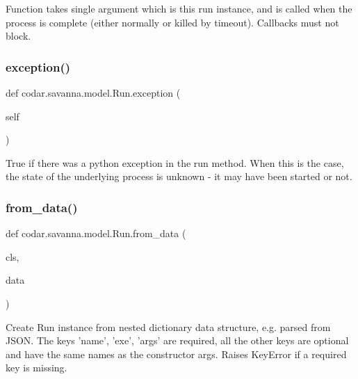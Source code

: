 \begin{DoxyVerb}Function takes single argument which is this run instance, and is
called when the process is complete (either normally or killed by
timeout). Callbacks must not block.\end{DoxyVerb}
 \mbox{\label{classcodar_1_1savanna_1_1model_1_1_run_a3e764a9c156037997b107a268716cf7e}} 
\subsubsection{\texorpdfstring{exception()}{exception()}}
{\footnotesize\ttfamily def codar.\+savanna.\+model.\+Run.\+exception (\begin{DoxyParamCaption}\item[{}]{self }\end{DoxyParamCaption})}

\begin{DoxyVerb}True if there was a python exception in the run method. When this
is the case, the state of the underlying process is unknown - it may
have been started or not.\end{DoxyVerb}
 \mbox{\label{classcodar_1_1savanna_1_1model_1_1_run_a8fab27229098b129079844b82035eab2}} 
\subsubsection{\texorpdfstring{from\+\_\+data()}{from\_data()}}
{\footnotesize\ttfamily def codar.\+savanna.\+model.\+Run.\+from\+\_\+data (\begin{DoxyParamCaption}\item[{}]{cls,  }\item[{}]{data }\end{DoxyParamCaption})}

\begin{DoxyVerb}Create Run instance from nested dictionary data structure, e.g.
parsed from JSON. The keys 'name', 'exe', 'args' are required, all the
other keys are optional and have the same names as the constructor
args. Raises KeyError if a required key is missing.\end{DoxyVerb}
 \mbox{\label{classcodar_1_1savanna_1_1model_1_1_run_a3b135416fb501328bba834045d2265b0}} 
